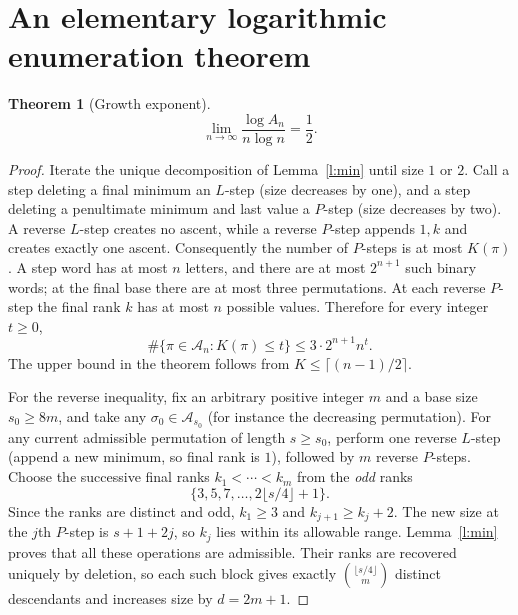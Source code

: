 \documentclass[11pt]{article}
\newtheorem{theorem}{Theorem}
\newcommand{\Av}{\mathcal{A}}
\begin{document}
\section{An elementary logarithmic enumeration theorem}
\begin{theorem}[Growth exponent]\label{t:exponent}
\[
\lim_{n\to\infty}\frac{\log A_n}{n\log n}=\frac12.
\]
\end{theorem}
\begin{proof}
Iterate the unique decomposition of Lemma~\ref{l:min} until size $1$ or $2$. Call a step deleting a final minimum an $L$-step (size decreases by one), and a step deleting a penultimate minimum and last value a $P$-step (size decreases by two). A reverse $L$-step creates no ascent, while a reverse $P$-step appends $1,k$ and creates exactly one ascent. Consequently the number of $P$-steps is at most $K(\pi)$. A step word has at most $n$ letters, and there are at most $2^{n+1}$ such binary words; at the final base there are at most three permutations. At each reverse $P$-step the final rank $k$ has at most $n$ possible values. Therefore for every integer $t\ge0$,
\begin{equation}\label{eq:upper}
\#\{\pi\in\Av_n:K(\pi)\le t\}\le 3\cdot2^{n+1}n^t.
\end{equation}
The upper bound in the theorem follows from $K\le\lceil(n-1)/2\rceil$.

For the reverse inequality, fix an arbitrary positive integer $m$ and a base size $s_0\ge8m$, and take any $\sigma_0\in\Av_{s_0}$ (for instance the decreasing permutation). For any current admissible permutation of length $s\ge s_0$, perform one reverse $L$-step (append a new minimum, so final rank is $1$), followed by $m$ reverse $P$-steps. Choose the successive final ranks $k_1<\cdots<k_m$ from the \emph{odd} ranks
\[
\{3,5,7,\ldots,2\lfloor s/4\rfloor+1\}.
\]
Since the ranks are distinct and odd, $k_1\ge3$ and $k_{j+1}\ge k_j+2$. The new size at the $j$th $P$-step is $s+1+2j$, so $k_j$ lies within its allowable range. Lemma~\ref{l:min} proves that all these operations are admissible. Their ranks are recovered uniquely by deletion, so each such block gives exactly $\binom{\lfloor s/4\rfloor}{m}$ distinct descendants and increases size by $d=2m+1$.


\end{proof}
\end{document}
